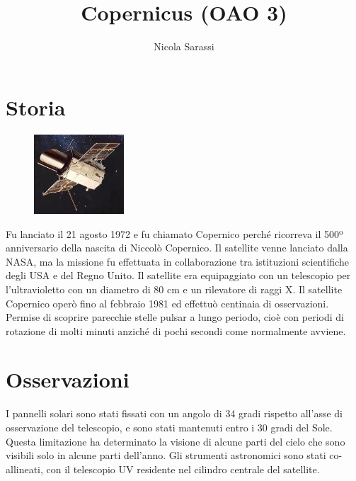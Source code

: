 \documentclass[12pt,a4paper]{article}
\begin{document}
\title{\vspace{-70pt}Copernicus (OAO 3)}
\author{Nicola Sarassi}
\date{}
\maketitle
\pagestyle{empty}
\thispagestyle{empty}

\section*{Storia}
\label{storia}
\begin{figure}
  \vspace{-10pt}
  \begin{center}
    \includegraphics[width=0.30\textwidth]{satellite}
  \end{center}
  \vspace{-20pt}
\end{figure}
Fu lanciato il 21 agosto 1972 e fu chiamato Copernico perché ricorreva il 500º anniversario della nascita di Niccolò Copernico. Il satellite venne lanciato dalla NASA, ma la missione fu effettuata in collaborazione tra istituzioni scientifiche degli USA e del Regno Unito. Il satellite era equipaggiato con un telescopio per l'ultravioletto con un diametro di 80 cm e un rilevatore di raggi X. Il satellite Copernico operò fino al febbraio 1981 ed effettuò centinaia di osservazioni. Permise di scoprire parecchie stelle pulsar a lungo periodo, cioè con periodi di rotazione di molti minuti anziché di pochi secondi come normalmente avviene.

\section*{Osservazioni}
\label{osservazioni}

I pannelli solari sono stati fissati con un angolo di 34 gradi rispetto all'asse di osservazione del telescopio, e sono stati mantenuti entro i 30 gradi del Sole. Questa limitazione ha determinato la visione di alcune parti del cielo che sono visibili solo in alcune parti dell'anno. Gli strumenti astronomici sono stati co-allineati, con il telescopio UV residente nel cilindro centrale del satellite. 
\end{document}
